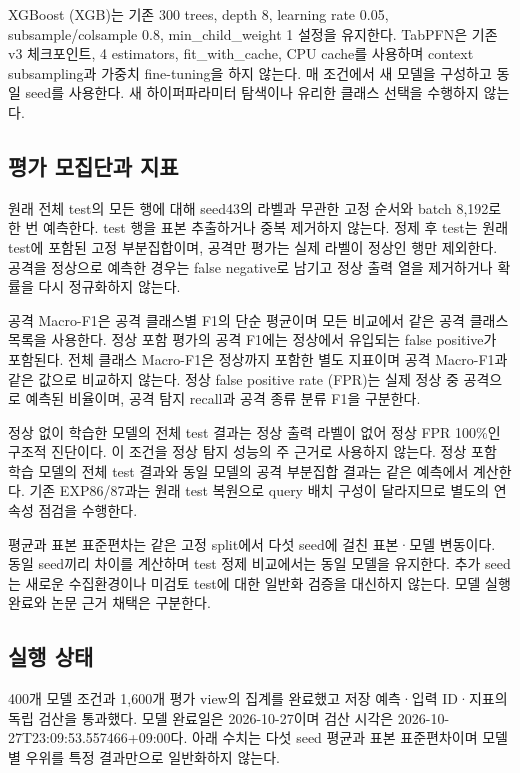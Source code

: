 XGBoost (XGB)는 기존 300 trees, depth 8, learning rate 0.05, subsample/\allowbreak{}colsample 0.8, min\_\allowbreak{}child\_\allowbreak{}weight 1 설정을 유지한다. TabPFN은 기존 v3 체크포인트, 4 estimators, fit\_\allowbreak{}with\_\allowbreak{}cache, CPU cache를 사용하며 context subsampling과 가중치 fine-tuning을 하지 않는다. 매 조건에서 새 모델을 구성하고 동일 seed를 사용한다. 새 하이퍼파라미터 탐색이나 유리한 클래스 선택을 수행하지 않는다.

\subsection{평가 모집단과 지표}
원래 전체 test의 모든 행에 대해 seed43의 라벨과 무관한 고정 순서와 batch 8,192로 한 번 예측한다. test 행을 표본 추출하거나 중복 제거하지 않는다. 정제 후 test는 원래 test에 포함된 고정 부분집합이며, 공격만 평가는 실제 라벨이 정상인 행만 제외한다. 공격을 정상으로 예측한 경우는 false negative로 남기고 정상 출력 열을 제거하거나 확률을 다시 정규화하지 않는다.

공격 Macro-F1은 공격 클래스별 F1의 단순 평균이며 모든 비교에서 같은 공격 클래스 목록을 사용한다. 정상 포함 평가의 공격 F1에는 정상에서 유입되는 false positive가 포함된다. 전체 클래스 Macro-F1은 정상까지 포함한 별도 지표이며 공격 Macro-F1과 같은 값으로 비교하지 않는다. 정상 false positive rate (FPR)는 실제 정상 중 공격으로 예측된 비율이며, 공격 탐지 recall과 공격 종류 분류 F1을 구분한다.

정상 없이 학습한 모델의 전체 test 결과는 정상 출력 라벨이 없어 정상 FPR 100\%인 구조적 진단이다. 이 조건을 정상 탐지 성능의 주 근거로 사용하지 않는다. 정상 포함 학습 모델의 전체 test 결과와 동일 모델의 공격 부분집합 결과는 같은 예측에서 계산한다. 기존 EXP86/\allowbreak{}87과는 원래 test 복원으로 query 배치 구성이 달라지므로 별도의 연속성 점검을 수행한다.

평균과 표본 표준편차는 같은 고정 split에서 다섯 seed에 걸친 표본·모델 변동이다. 동일 seed끼리 차이를 계산하며 test 정제 비교에서는 동일 모델을 유지한다. 추가 seed는 새로운 수집환경이나 미검토 test에 대한 일반화 검증을 대신하지 않는다. 모델 실행 완료와 논문 근거 채택은 구분한다.

\subsection{실행 상태}
400개 모델 조건과 1,600개 평가 view의 집계를 완료했고 저장 예측·입력 ID·지표의 독립 검산을 통과했다. 모델 완료일은 2026-10-27이며 검산 시각은 2026-10-27T23:09:53.557466+\allowbreak{}09:00다. 아래 수치는 다섯 seed 평균과 표본 표준편차이며 모델별 우위를 특정 결과만으로 일반화하지 않는다.

